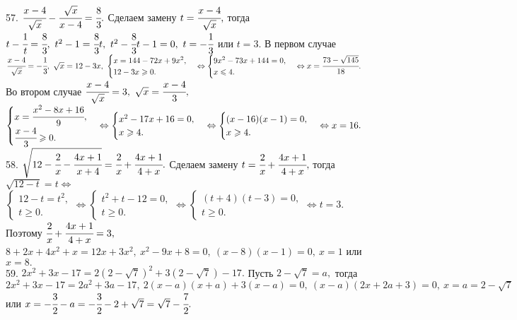 57. $\cfrac{x-4}{\sqrt{x}}-\cfrac{\sqrt{x}}{x-4}=\cfrac{8}{3}.$ Сделаем замену $t=\cfrac{x-4}{\sqrt{x}},$ тогда $t-\cfrac{1}{t}=\cfrac{8}{3},\ t^2-1=\cfrac{8}{3}t,\
 t^2-\cfrac{8}{3}t-1=0,\ t=-\cfrac{1}{3}$ или $t=3.$ В первом случае $\cfrac{x-4}{\sqrt{x}}=-\cfrac{1}{3},\ \sqrt{x}=12-3x,\ \begin{cases} x=144-72x+9x^2,\\ 12-3x\geqslant0.\end{cases}\Leftrightarrow\begin{cases} 9x^2-73x+144=0,\\ x\leqslant4.\end{cases}\Leftrightarrow x=\cfrac{73-\sqrt{145}}{18}.$ Во втором случае $
\cfrac{x-4}{\sqrt{x}}=3,\ \sqrt{x}=\cfrac{x-4}{3},$\\$ \begin{cases} x=\cfrac{x^2-8x+16}{9},\\ \cfrac{x-4}{3}\geqslant0.\end{cases}\Leftrightarrow
\begin{cases} x^2-17x+16=0,\\ x\geqslant4.\end{cases}\Leftrightarrow\begin{cases} (x-16)(x-1)=0,\\ x\geqslant4.\end{cases}\Leftrightarrow x=16.$\\
58. $\sqrt{12-\cfrac{2}{x}-\cfrac{4x+1}{x+4}}=\cfrac{2}{x}+\cfrac{4x+1}{4+x}.$ Сделаем замену $t=\cfrac{2}{x}+\cfrac{4x+1}{4+x},$ тогда $\sqrt{12-t}=t\Leftrightarrow$\\$ \begin{cases} 12-t=t^2,\\ t\geqslant0.\end{cases}\Leftrightarrow \begin{cases} t^2+t-12=0,\\ t\geqslant0.\end{cases}
\Leftrightarrow \begin{cases} (t+4)(t-3)=0,\\ t\geqslant0.\end{cases}\Leftrightarrow t=3.$ Поэтому $\cfrac{2}{x}+\cfrac{4x+1}{4+x}=3,$\\$
8+2x+4x^2+x=12x+3x^2,\ x^2-9x+8=0,\ (x-8)(x-1)=0,\ x=1$ или $x=8.$\\
59. $2x^2+3x-17=2(2-\sqrt{7})^2+3(2-\sqrt{7})-17.$ Пусть $2-\sqrt{7}=a,$ тогда $2x^2+3x-17=2a^2+3a-17,\ 2(x-a)(x+a)+3(x-a)=0,\ (x-a)(2x+2a+3)=0,\ x=a=2-\sqrt{7}$ или $x=-\cfrac{3}{2}-a=-\cfrac{3}{2}-2+\sqrt{7}=\sqrt{7}-\cfrac{7}{2}.$\\
